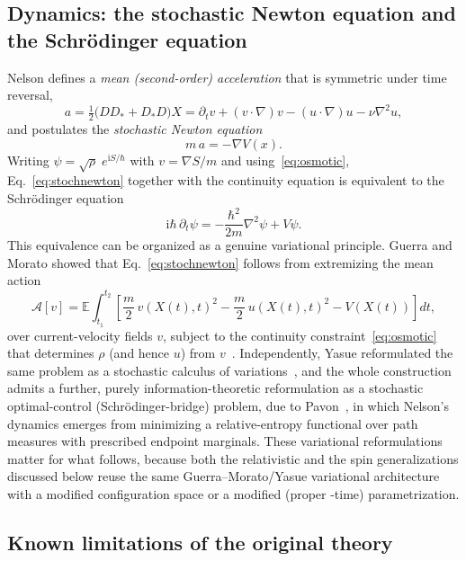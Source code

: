 \documentclass[11pt]{article}
\newcommand{\E}{\mathbb{E}}
\newcommand{\ii}{\mathrm{i}}
\begin{document}
\subsection{Dynamics: the stochastic Newton equation and the Schr\"odinger equation}

Nelson defines a \emph{mean (second-order) acceleration} that is symmetric under time reversal,
\begin{equation}
a = \tfrac12\big(DD_* + D_*D\big)X = \partial_t v + (v\cdot\nabla)v - (u\cdot\nabla)u - \nu\nabla^2 u,
\end{equation}
and postulates the \emph{stochastic Newton equation}
\begin{equation}\label{eq:stochnewton}
m\,a = -\nabla V(x).
\end{equation}
Writing $\psi = \sqrt{\rho}\;e^{\ii S/\hbar}$ with $v=\nabla S/m$ and
using~\eqref{eq:osmotic}, Eq.~\eqref{eq:stochnewton} together with the
continuity equation is equivalent to the Schr\"odinger equation
\begin{equation}
\ii\hbar\,\partial_t\psi = -\frac{\hbar^2}{2m}\nabla^2\psi + V\psi .
\end{equation}
This equivalence can be organized as a genuine variational principle.
Guerra and Morato showed that Eq.~\eqref{eq:stochnewton} follows from
extremizing the mean action
\begin{equation}\label{eq:guerramorato}
\mathcal A[v] = \E\int_{t_1}^{t_2}\left[\frac m2\,v(X(t),t)^2 - \frac m2\,u(X(t),t)^2 - V(X(t))\right]dt,
\end{equation}
over current-velocity fields $v$, subject to the continuity
constraint~\eqref{eq:osmotic} that determines $\rho$ (and hence $u$) from
$v$~\cite{guerramorato83}. Independently, Yasue reformulated the same
problem as a stochastic calculus of variations~\cite{yasue81}, and the
whole construction admits a further, purely information-theoretic
reformulation as a stochastic optimal-control (Schr\"odinger-bridge)
problem, due to Pavon~\cite{pavon95}, in which Nelson's dynamics emerges
from minimizing a relative-entropy functional over path measures with
prescribed endpoint marginals. These variational reformulations matter for
what follows, because both the relativistic and the spin generalizations
discussed below reuse the same Guerra--Morato/Yasue variational
architecture with a modified configuration space or a modified (proper
-time) parametrization.

\subsection{Known limitations of the original theory}
\end{document}
